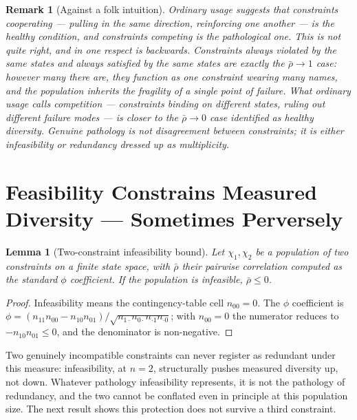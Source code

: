 \documentclass[12pt]{report}
\newtheorem{lemma}[definition]{Lemma}
\newtheorem{remark}[definition]{Remark}
\begin{document}
\begin{remark}[Against a folk intuition]
Ordinary usage suggests that constraints cooperating --- pulling in the
same direction, reinforcing one another --- is the healthy condition,
and constraints competing is the pathological one. This is not quite
right, and in one respect is backwards. Constraints always violated by
the same states and always satisfied by the same states are exactly the
$\bar\rho \to 1$ case: however many there are, they function as one
constraint wearing many names, and the population inherits the fragility
of a single point of failure. What ordinary usage calls competition ---
constraints binding on different states, ruling out different failure
modes --- is closer to the $\bar\rho \to 0$ case identified as healthy
diversity. Genuine pathology is not disagreement between constraints; it
is either infeasibility or redundancy dressed up as multiplicity.
\end{remark}

\section{Feasibility Constrains Measured Diversity --- Sometimes Perversely}

\begin{lemma}[Two-constraint infeasibility bound]
\label{lem:twoconstraint}
Let $\chi_1, \chi_2$ be a population of two constraints on a finite
state space, with $\bar\rho$ their pairwise correlation computed as the
standard $\phi$ coefficient. If the population is infeasible, $\bar\rho
\leq 0$.
\end{lemma}

\begin{proof}
Infeasibility means the contingency-table cell $n_{00} = 0$. The $\phi$
coefficient is $\phi = (n_{11}n_{00} - n_{10}n_{01}) /
\sqrt{n_{1\cdot}n_{0\cdot}n_{\cdot1}n_{\cdot0}}$; with $n_{00} = 0$ the
numerator reduces to $-n_{10}n_{01} \leq 0$, and the denominator is
non-negative.
\end{proof}

Two genuinely incompatible constraints can never register as redundant
under this measure: infeasibility, at $n = 2$, structurally pushes
measured diversity up, not down. Whatever pathology infeasibility
represents, it is not the pathology of redundancy, and the two cannot be
conflated even in principle at this population size. The next result
shows this protection does not survive a third constraint.
\end{document}
